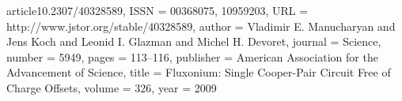 \begin{thebibliography}{99}
	article{10.2307/40328589,
		ISSN = {00368075, 10959203},
		URL = {http://www.jstor.org/stable/40328589},
		author = {Vladimir E. Manucharyan and Jens Koch and Leonid I. Glazman and Michel H. Devoret},
		journal = {Science},
		number = {5949},
		pages = {113--116},
		publisher = {American Association for the Advancement of Science},
		title = {Fluxonium: Single Cooper-Pair Circuit Free of Charge Offsets},
		volume = {326},
		year = {2009}
	}

\end{thebibliography}